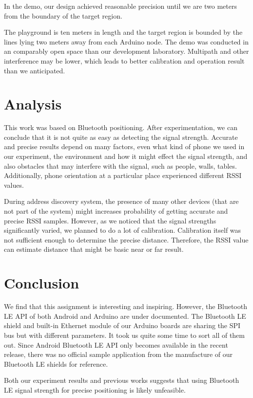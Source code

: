 \documentclass[conference,a4paper]{../../sty/IEEEtran}
\begin{document}
In the demo, our design achieved reasonable precision until we are two meters from the boundary of the target region.

The playground is ten meters in length and the target region is bounded by the lines lying two meters away from each Arduino node.
The demo was conducted in an comparably open space than our development laboratory.
Multipath and other interference may be lower, which leads to better calibration and operation result than we anticipated.


\section{Analysis}

This work was based on Bluetooth positioning. After experimentation, we can conclude that it is not quite as easy as detecting the signal strength. Accurate and precise results depend on many factors, even what kind of phone we used in our experiment, the environment and how it might effect the signal strength, and also obstacles that may interfere with the signal, such as people, walls, tables. Additionally, phone orientation at a particular place experienced different RSSI values.

During address discovery system, the presence of many other devices (that are not part of the system) might 
increases probability of getting accurate and precise RSSI samples. However, as we noticed that the signal strengths significantly varied, we planned to do a lot of calibration. Calibration itself was not sufficient enough to determine the precise distance. Therefore, the RSSI value can estimate distance that might be basic near or far result. 

\section{Conclusion}

We find that this assignment is interesting and inspiring.
However, the Bluetooth LE API of both Android and Arduino are under documented.
The Bluetooth LE shield and built-in Ethernet module of our Arduino boards are sharing the SPI bus but with different parameters.
It took us quite some time to sort all of them out.
Since Android Bluetooth LE API only becomes available in the recent release, there was no official sample application from the manufacture of our Bluetooth LE shields for reference.

Both our experiment results and previous works suggests that using Bluetooth LE signal strength for precise positioning is likely unfeasible.
\end{document}
